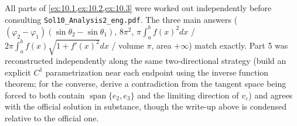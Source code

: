 \begin{ainote}
All parts of \cref{ex:10.1,ex:10.2,ex:10.3} were worked out independently before consulting
\texttt{Sol10\_Analysis2\_eng.pdf}. The three main answers ($(\varphi_2-\varphi_1)(\sin\theta_2
-\sin\theta_1)$, $8\pi^2$, $\pi\int_a^bf(x)^2dx$ / $2\pi\int_a^bf(x)\sqrt{1+f'(x)^2}dx$ /
volume $\pi$, area $+\infty$) match exactly. Part 5 was reconstructed independently along the
same two-directional strategy (build an explicit $C^1$ parametrization near each endpoint
using the inverse function theorem; for the converse, derive a contradiction from the tangent
space being forced to both contain $\operatorname{span}\{e_2,e_3\}$ and the limiting
direction of $v_\varepsilon$) and agrees with the official solution in substance, though the
write-up above is condensed relative to the official one.
\end{ainote}
